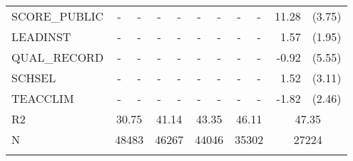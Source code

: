 \documentclass[10pt]{article}
\begin{document}
\begin{table}[htbp]
\begin{tabular}{lrlrlrlrlrl}
      SCORE\_PUBLIC & \multicolumn{1}{c}{-} & \multicolumn{1}{c}{-} & \multicolumn{1}{c}{-} & \multicolumn{1}{c}{-} & \multicolumn{1}{c}{-} & \multicolumn{1}{c}{-} & \multicolumn{1}{c}{-} & \multicolumn{1}{c}{-} & 11.28 & (3.75) \\[0.2em]
      LEADINST & \multicolumn{1}{c}{-} & \multicolumn{1}{c}{-} & \multicolumn{1}{c}{-} & \multicolumn{1}{c}{-} & \multicolumn{1}{c}{-} & \multicolumn{1}{c}{-} & \multicolumn{1}{c}{-} & \multicolumn{1}{c}{-} & 1.57  & (1.95) \\[0.2em]
      QUAL\_RECORD & \multicolumn{1}{c}{-} & \multicolumn{1}{c}{-} & \multicolumn{1}{c}{-} & \multicolumn{1}{c}{-} & \multicolumn{1}{c}{-} & \multicolumn{1}{c}{-} & \multicolumn{1}{c}{-} & \multicolumn{1}{c}{-} & -0.92 & (5.55) \\[0.2em]
      SCHSEL & \multicolumn{1}{c}{-} & \multicolumn{1}{c}{-} & \multicolumn{1}{c}{-} & \multicolumn{1}{c}{-} & \multicolumn{1}{c}{-} & \multicolumn{1}{c}{-} & \multicolumn{1}{c}{-} & \multicolumn{1}{c}{-} & 1.52  & (3.11) \\[0.2em]
      TEACCLIM & \multicolumn{1}{c}{-} & \multicolumn{1}{c}{-} & \multicolumn{1}{c}{-} & \multicolumn{1}{c}{-} & \multicolumn{1}{c}{-} & \multicolumn{1}{c}{-} & \multicolumn{1}{c}{-} & \multicolumn{1}{c}{-} & -1.82 & (2.46) \\[0.2em]
      R2    & \multicolumn{2}{c}{30.75} & \multicolumn{2}{c}{41.14} & \multicolumn{2}{c}{43.35} & \multicolumn{2}{c}{46.11} & \multicolumn{2}{c}{47.35} \\[0.2em]
      N     & \multicolumn{2}{c}{48483} & \multicolumn{2}{c}{46267} & \multicolumn{2}{c}{44046} & \multicolumn{2}{c}{35302} & \multicolumn{2}{c}{27224} \\[0.2em]
     	\bottomrule
     	\\  	     	        
 \end{tabular}%
 \label{tab:addlabel}%
\end{table}%
 
\end{document}
